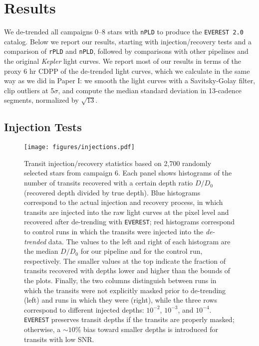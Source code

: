 \documentclass[]{emulateapj}
\begin{document}
\section{Results}
\label{sec:results}

We de-trended all campaigns 0--8 stars with \texttt{nPLD} to produce the 
\texttt{EVEREST 2.0} catalog. Below we report our results, starting with
injection/recovery tests and a comparison of \texttt{rPLD} and \texttt{nPLD},
followed by comparisons with other pipelines and the original \emph{Kepler}
light curves. We report most of our results in terms of the proxy 6 hr CDPP of
the de-trended light curves, which we calculate in the same way as we did
in Paper I: we smooth the light curves with a Savitsky-Golay filter, clip
outliers at 5$\sigma$, and compute the median standard deviation in 13-cadence
segments, normalized by $\sqrt{13}$.

\subsection{Injection Tests}
\label{sec:inj}

\begin{figure}[hbt]
  \begin{center}
      \texttt{[image: figures/injections.pdf]}
       \caption{Transit injection/recovery statistics based on 2,700 randomly selected stars from campaign 6.
       Each panel shows histograms of the number of transits recovered with a certain depth 
       ratio $D/D_0$ (recovered depth divided by true depth). Blue histograms correspond to the actual
       injection and recovery process, in which transits are injected into the raw light curves at the pixel level
       and recovered after de-trending with \texttt{EVEREST}; red histograms correspond to control runs in which the transits
       were injected into the \emph{de-trended} data. The values 
       to the left and right of each histogram are the median $D/D_0$ for our pipeline and for the 
       control run, respectively. The smaller values at the top indicate the fraction of transits recovered 
       with depths lower and higher than the bounds of the plots. Finally, the two columns distinguish between 
       runs in which the transits were not explicitly masked prior to de-trending (left) and runs in which they were (right), 
       while the three rows correspond to different injected depths: $10^{−2}$, $10^{−3}$, and $10^{−4}$. \texttt{EVEREST} 
       preserves transit depths if the transits are properly masked; otherwise, a ${\sim}10\%$ bias toward smaller depths is 
       introduced for transits with low SNR.}
     \label{fig:injections}
  \end{center}
\end{figure}
\end{document}

